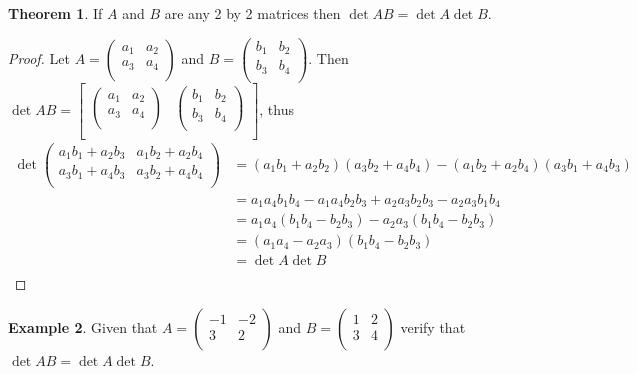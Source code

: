 \documentclass[11pt,a4paper]{article}
\theoremstyle{definition}
\newtheorem{thm}{Theorem}[subsection]
\newtheorem{exa}[thm]{Example}
\begin{document}
\begin{thm}
If $A$ and $B$ are any 2 by 2 matrices then $\det AB=\det A\det B$.
\end{thm}
\begin{proof}
Let $A=
\begin{pmatrix}
a_1&a_2\\a_3&a_4\\
\end{pmatrix}
$ and $B=
\begin{pmatrix}
b_1&b_2\\b_3&b_4\\
\end{pmatrix}
$. Then $\det AB=
\begin{bmatrix}
\begin{pmatrix}
a_1&a_2\\a_3&a_4\\
\end{pmatrix}
&
\begin{pmatrix}
b_1&b_2\\b_3&b_4\\
\end{pmatrix}\\
\end{bmatrix}
$, thus 
\begin{align*}
\det
\begin{pmatrix}
a_1b_1+a_2b_3&a_1b_2+a_2b_4\\a_3b_1+a_4b_3&a_3b_2+a_4b_4\\
\end{pmatrix}
&=(a_1b_1+a_2b_2)(a_3b_2+a_4b_4)-(a_1b_2+a_2b_4)(a_3b_1+a_4b_3)\\
&=a_1a_4b_1b_4-a_1a_4b_2b_3+a_2a_3b_2b_3-a_2a_3b_1b_4\\
&=a_1a_4(b_1b_4-b_2b_3)-a_2a_3(b_1b_4-b_2b_3)\\
&=(a_1a_4-a_2a_3)(b_1b_4-b_2b_3)\\
&=\det A\det B\\
\end{align*}
\end{proof}


\begin{exa}
Given that $A=
\begin{pmatrix}
-1&-2\\3&2\\
\end{pmatrix}
$ and $B=
\begin{pmatrix}
1&2\\3&4\\
\end{pmatrix}
$ verify that $\det AB=\det A\det B$.
\end{exa}
\end{document}
